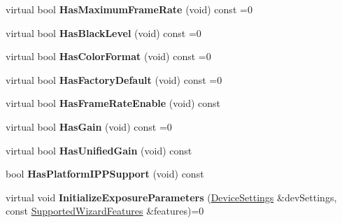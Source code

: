 \begin{DoxyCompactItemize}
\item 
\hypertarget{class_wizard_quick_setup_aed24c2c4f7ac4296c710a033fc8dafde}{virtual bool {\bfseries Has\+Maximum\+Frame\+Rate} (void) const =0}\label{class_wizard_quick_setup_aed24c2c4f7ac4296c710a033fc8dafde}

\item 
\hypertarget{class_wizard_quick_setup_a55af61ca3c8a47a4b811edeb132933a0}{virtual bool {\bfseries Has\+Black\+Level} (void) const =0}\label{class_wizard_quick_setup_a55af61ca3c8a47a4b811edeb132933a0}

\item 
\hypertarget{class_wizard_quick_setup_ad560aa070c319efcfca2b188794f5eb1}{virtual bool {\bfseries Has\+Color\+Format} (void) const =0}\label{class_wizard_quick_setup_ad560aa070c319efcfca2b188794f5eb1}

\item 
\hypertarget{class_wizard_quick_setup_a5e6596d491a6b15cbc8719f8bf2a8167}{virtual bool {\bfseries Has\+Factory\+Default} (void) const =0}\label{class_wizard_quick_setup_a5e6596d491a6b15cbc8719f8bf2a8167}

\item 
\hypertarget{class_wizard_quick_setup_a8f3ed9c8788b4684699967a49b934a5c}{virtual bool {\bfseries Has\+Frame\+Rate\+Enable} (void) const }\label{class_wizard_quick_setup_a8f3ed9c8788b4684699967a49b934a5c}

\item 
\hypertarget{class_wizard_quick_setup_a3d097cfea790a65963cf357254b9483d}{virtual bool {\bfseries Has\+Gain} (void) const =0}\label{class_wizard_quick_setup_a3d097cfea790a65963cf357254b9483d}

\item 
\hypertarget{class_wizard_quick_setup_a9631749dd6f71ac8bc6fe394084c2e36}{virtual bool {\bfseries Has\+Unified\+Gain} (void) const }\label{class_wizard_quick_setup_a9631749dd6f71ac8bc6fe394084c2e36}

\item 
\hypertarget{class_wizard_quick_setup_ab516d40b9298c4f56caf715a45cfb7e8}{bool {\bfseries Has\+Platform\+I\+P\+P\+Support} (void) const }\label{class_wizard_quick_setup_ab516d40b9298c4f56caf715a45cfb7e8}

\item 
\hypertarget{class_wizard_quick_setup_a416574623718d6dc1bd6ab4be1b03779}{virtual void {\bfseries Initialize\+Exposure\+Parameters} (\hyperlink{struct_wizard_quick_setup_1_1_device_settings}{Device\+Settings} \&dev\+Settings, const \hyperlink{struct_wizard_quick_setup_1_1_supported_wizard_features}{Supported\+Wizard\+Features} \&features)=0}\label{class_wizard_quick_setup_a416574623718d6dc1bd6ab4be1b03779}


\end{DoxyCompactItemize}
